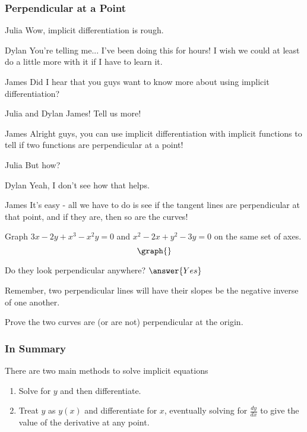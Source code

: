 \documentclass{ximera}
\begin{document}
\subsubsection{Perpendicular at a Point}
\begin{dialogue}
\item[Julia] Wow, implicit differentiation is rough.
\item[Dylan] You're telling me... I've been doing this for hours! I wish we could at least do a little more with it if I have to learn it.
\item[James] Did I hear that you guys want to know more about using implicit differentiation?
\item[Julia and Dylan] James! Tell us more!
\item[James] Alright guys, you can use implicit differentiation with implicit functions to tell if two functions are perpendicular at a point!
\item[Julia] But how?
\item[Dylan] Yeah, I don't see how that helps.
\item[James] It's easy - all we have to do is see if the tangent lines are perpendicular at that point, and if they are, then so are the curves!
\end{dialogue}
\begin{question}
Graph $3x - 2y + x^3-x^2y = 0$ and $x^2 - 2x + y^2 - 3y = 0$ on the same set of axes.
\[
\graph{}
\]

Do they look perpendicular anywhere?
$\answer{Yes}$
\end{question}
\begin{question}
\begin{hint}
Remember, two perpendicular lines will have their slopes be the negative inverse of one another.
\end{hint}
Prove the two curves are (or are not) perpendicular at the origin.
\begin{freeResponse}
\end{freeResponse}
\end{question}


\subsubsection{In Summary}
There are two main methods to solve implicit equations 
\begin{enumerate}
\item{Solve for $y$ and then differentiate.}
\item{Treat $y$ as $y(x)$ and differentiate for $x$, eventually solving for $\frac{dy}{dx}$ to give the value of the derivative at any point.}
\end{enumerate}
\pagebreak
\end{document}
